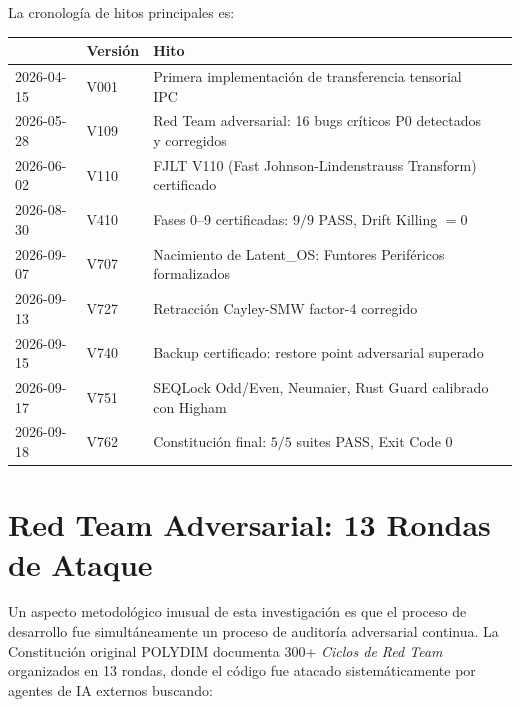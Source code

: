 La cronología de hitos principales es:

\begin{tabular}{llll}}
\hline
\textbf{Fecha} & \textbf{Versión} & \textbf{Hito} \\
\hline
2026-04-15 & V001 & Primera implementación de transferencia tensorial IPC \\
2026-05-28 & V109 & Red Team adversarial: 16 bugs críticos P0 detectados y corregidos \\
2026-06-02 & V110 & FJLT V110 (Fast Johnson-Lindenstrauss Transform) certificado \\
2026-08-30 & V410 & Fases 0--9 certificadas: $9/9$ PASS, Drift Killing $= 0$ \\
2026-09-07 & V707 & Nacimiento de Latent\_OS: Funtores Periféricos formalizados \\
2026-09-13 & V727 & Retracción Cayley-SMW factor-4 corregido \\
2026-09-15 & V740 & Backup certificado: restore point adversarial superado \\
2026-09-17 & V751 & SEQLock Odd/Even, Neumaier, Rust Guard calibrado con Higham \\
2026-09-18 & V762 & Constitución final: $5/5$ suites PASS, Exit Code 0 \\
\hline


\end{tabular}

\section{Red Team Adversarial: 13 Rondas de Ataque}

Un aspecto metodológico inusual de esta investigación es que el proceso de
desarrollo fue simultáneamente un proceso de auditoría adversarial continua.
La Constitución original POLYDIM documenta 300+ \textit{Ciclos de Red Team}
organizados en 13 rondas, donde el código fue atacado sistemáticamente por
agentes de IA externos buscando:

